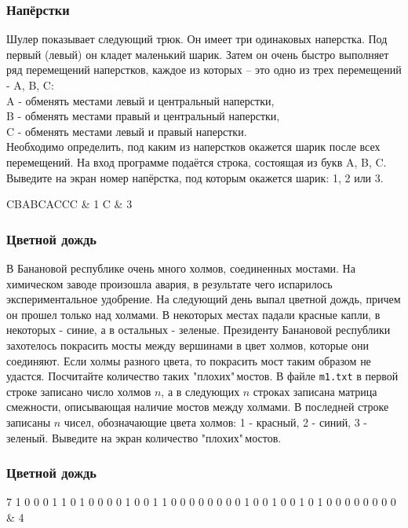 \begin{frame}
	\frametitle{Напёрстки}
 Шулер показывает следующий трюк. Он имеет три одинаковых наперстка. Под первый
	(левый) он кладет маленький шарик. Затем он очень быстро выполняет ряд
	перемещений наперстков, каждое из которых – это одно из трех перемещений - A,
	B, C: \\
	 A - обменять местами левый и центральный наперстки, \\
   B - обменять местами правый и центральный наперстки, \\
   C - обменять местами левый и правый наперстки. \\
Необходимо определить, под каким из наперстков окажется шарик после всех перемещений. 
	\inp
	На вход программе подаётся строка, состоящая из букв A, B, C.
	\out
	Выведите на экран номер напёрстка, под которым окажется шарик: 1, 2 или 3.
	\begin{ex}
		CBABCACCC & 1 \tb
		C & 3 \tb
	\end{ex}
\end{frame}

\begin{frame}
	\frametitle{Цветной дождь}
В Банановой республике очень много холмов, соединенных мостами. На химическом
	заводе произошла авария, в результате чего испарилось экспериментальное
	удобрение. На следующий день выпал цветной дождь, причем он прошел только над
	холмами. В некоторых местах падали красные капли, в некоторых - синие, а в
	остальных - зеленые.  Президенту Банановой республики захотелось покрасить
	мосты между вершинами в цвет холмов, которые они соединяют. Если холмы разного
	цвета, то покрасить мост таким образом не удастся. Посчитайте количество таких
	"плохих"$\,$мостов.  
	\inp  
	В файле {\tt m1.txt} в первой строке записано число холмов $n$, а в следующих
	$n$ строках записана матрица смежности, описывающая наличие мостов между
	холмами. В последней строке записаны $n$ чисел, обозначающие цвета холмов: 1 -
	красный, 2 - синий, 3 - зеленый.
	\out
	Выведите на экран количество "плохих"$\,$мостов.
\end{frame}

\begin{frame}
	\frametitle{Цветной дождь}
	\leavevmode
	\begin{ex}
7  1 0 0 0 1 1  0 1 0 0 0 0  1 0 0 1 1 0  0 0 0 0 0 0  0 1 0 0 1 0  0 1 0 1 0 0  0 0 0 0 0 0 \newline & 4 \tb
	\end{ex}
\end{frame}

